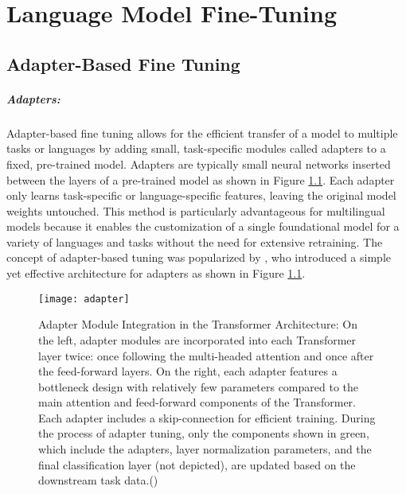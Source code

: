 \chapter{Language Model Fine-Tuning}\label{chp: Fine tuning}
\section{Adapter-Based Fine Tuning}
\paragraph{Adapters:} Adapter-based fine tuning allows for the efficient transfer of a model to multiple tasks or languages by adding small, task-specific modules called adapters to a fixed, pre-trained model. Adapters are typically small neural networks inserted between the layers of a pre-trained model as shown in Figure \ref{fig: adapter}. Each adapter only learns task-specific or language-specific features, leaving the original model weights untouched. This method is particularly advantageous for multilingual models because it enables the customization of a single foundational model for a variety of languages and tasks without the need for extensive retraining. The concept of adapter-based tuning was popularized by \citet{houlsby2019parameter}, who introduced a simple yet effective architecture for adapters as shown in Figure \ref{fig: adapter}.

\begin{figure}[hbt]
	\centering
	\texttt{[image: adapter]}
	\caption[Adapter Module Integration in the Transformer Architecture]{Adapter Module Integration in the Transformer Architecture: On the left, adapter modules are incorporated into each Transformer layer twice: once following the multi-headed attention and once after the feed-forward layers. On the right, each adapter features a bottleneck design with relatively few parameters compared to the main attention and feed-forward components of the Transformer. Each adapter includes a skip-connection for efficient training. During the process of adapter tuning, only the components shown in green, which include the adapters, layer normalization parameters, and the final classification layer (not depicted), are updated based on the downstream task data.(\citet{houlsby2019parameter})}
	\label{fig: adapter}
\end{figure}

